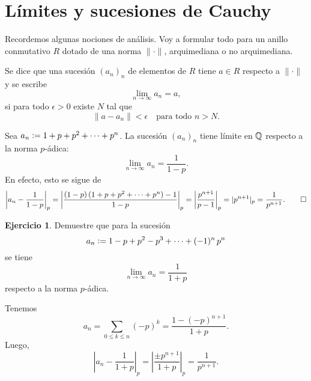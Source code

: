 \documentclass{article}
\numberwithin{equation}{section}
\theoremstyle{definition}
\newtheorem{ejerc}{Ejercicio}
\begin{document}

\section{Límites y sucesiones de Cauchy}

Recordemos algunas nociones de análisis. Voy a formular todo para un anillo
conmutativo $R$ dotado de una norma $\|\cdot\|$, arquimediana o no arquimediana.

\begin{definicion}
  Se dice que una sucesión $(a_n)_n$ de elementos de $R$ tiene 
  $a\in R$ respecto a $\|\cdot\|$ y se escribe
  $$\lim_{n\to\infty} a_n = a,$$
  si para todo $\epsilon > 0$ existe $N$ tal que
  $$\|a - a_n\| < \epsilon\quad\text{para todo }n > N.$$
\end{definicion}

\begin{ejemplo}
  \label{ejemplo:1+p+p^2+cdots}
  Sea $a_n \mathrel{\mathop:}= 1 + p + p^2 + \cdots + p^n$. La sucesión $(a_n)_n$ tiene límite
  en $\mathbb{Q}$ respecto a la norma $p$-ádica:
  $$\lim_{n\to\infty} a_n = \frac{1}{1-p}.$$
  En efecto, esto se sigue de
  \[ \left|a_n - \frac{1}{1-p}\right|_p =
     \left|\frac{(1-p)\,(1 + p + p^2 + \cdots + p^n) - 1}{1-p}\right|_p =
     \left|\frac{p^{n+1}}{p-1}\right|_p =
     |p^{n+1}|_p = \frac{1}{p^{n+1}}. \qedhere \]
\end{ejemplo}

\begin{ejerc}
  Demuestre que para la sucesión
  $$a_n \mathrel{\mathop:}= 1 - p + p^2 - p^3 + \cdots + (-1)^n\,p^n$$
  se tiene
  $$\lim_{n\to\infty} a_n = \frac{1}{1+p}$$
  respecto a la norma $p$-ádica.

  \ifdefined\solutions\begin{solucion}
    Tenemos
    $$a_n = \sum_{0 \le k \le n} (-p)^k = \frac{1 - (-p)^{n+1}}{1+p}.$$
    Luego,
    \[ \left|a_n - \frac{1}{1+p}\right|_p =
       \left|\frac{\pm p^{n+1}}{1+p}\right|_p =
       \frac{1}{p^{n+1}}. \]
  \end{solucion}\fi
\end{ejerc}
\end{document}
